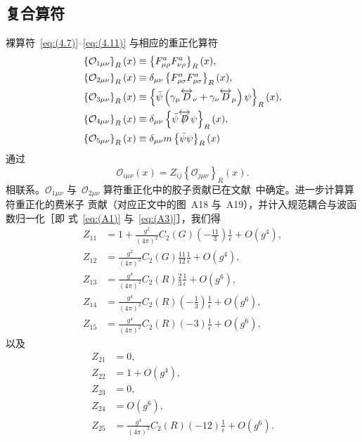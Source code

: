 \subsection{复合算符}
裸算符~\eqref{eq:(4.7)}--\eqref{eq:(4.11)} 与相应的重正化算符
\begin{align}
   \left\{\mathcal{O}_{1\mu\nu}\right\}_R(x)&\equiv
   \left\{F_{\mu\rho}^aF_{\nu\rho}^a\right\}_R(x),
\label{eq:(A5)}\\
   \left\{\mathcal{O}_{2\mu\nu}\right\}_R(x)&\equiv
   \delta_{\mu\nu}\left\{F_{\rho\sigma}^aF_{\rho\sigma}^a\right\}_R(x),
\label{eq:(A6)}\\
   \left\{\mathcal{O}_{3\mu\nu}\right\}_R(x)&\equiv
   \left\{\Bar{\psi}
   \left(\gamma_\mu\overleftrightarrow{D}_\nu
   +\gamma_\nu\overleftrightarrow{D}_\mu\right)
   \psi\right\}_R(x),
\label{eq:(A7)}\\
   \left\{\mathcal{O}_{4\mu\nu}\right\}_R(x)&\equiv
   \delta_{\mu\nu}\left\{\Bar{\psi}
   \overleftrightarrow{\Slash{D}}
   \psi\right\}_R(x),
\label{eq:(A8)}\\
   \left\{\mathcal{O}_{5\mu\nu}\right\}_R(x)&\equiv
   \delta_{\mu\nu}m\left\{\Bar{\psi}
   \psi\right\}_R(x)
\label{eq:(A9)}
\end{align}
通过
\begin{equation}
   \mathcal{O}_{i\mu\nu}(x)
   =Z_{ij}\left\{\mathcal{O}_{j\mu\nu}\right\}_R(x).
\label{eq:(A10)}
\end{equation}
相联系。$\mathcal{O}_{1\mu\nu}$ 与~$\mathcal{O}_{2\mu\nu}$
算符重正化中的胶子贡献已在文献~\cite{Suzuki:2013gza}中确定。进一步计算算符重正化的费米子
贡献（对应正文中的图~A18 与~A19），并计入规范耦合与波函数归一化［即
式~\eqref{eq:(A1)} 与~\eqref{eq:(A3)}］，我们得
\begin{align}
   Z_{11}
   &=1+\frac{g^2}{(4\pi)^2}C_2(G)
   \left(-\frac{11}{3}\right)
   \frac{1}{\epsilon}+O(g^4),
\label{eq:(A11)}\\
   Z_{12}
   &=\frac{g^2}{(4\pi)^2}C_2(G)\frac{11}{12}\frac{1}{\epsilon}+O(g^4),
\label{eq:(A12)}\\
   Z_{13}
   &=\frac{g^4}{(4\pi)^2}C_2(R)\frac{2}{3}\frac{1}{\epsilon}+O(g^6),
\label{eq:(A13)}\\
   Z_{14}
   &=\frac{g^4}{(4\pi)^2}C_2(R)\left(-\frac{1}{3}\right)\frac{1}{\epsilon}
   +O(g^6),
\label{eq:(A14)}\\
   Z_{15}
   &=\frac{g^4}{(4\pi)^2}C_2(R)(-3)\frac{1}{\epsilon}+O(g^6),
\label{eq:(A15)}
\end{align}
以及
\begin{align}
   Z_{21}
   &=0,
\label{eq:(A16)}\\
   Z_{22}
   &=1+O(g^4),
\label{eq:(A17)}\\
   Z_{23}
   &=0,
\label{eq:(A18)}\\
   Z_{24}
   &=O(g^6),
\label{eq:(A19)}\\
   Z_{25}
   &=\frac{g^4}{(4\pi)^2}C_2(R)(-12)\frac{1}{\epsilon}+O(g^6).
\label{eq:(A20)}
\end{align}
